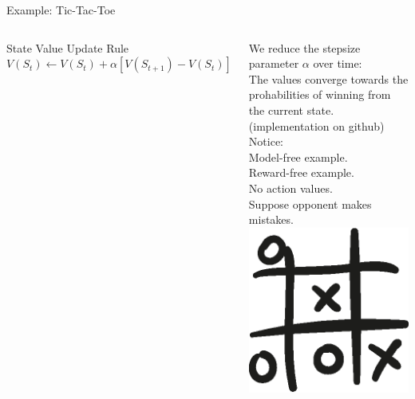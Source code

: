 \documentclass{beamer}
\begin{document}
\begin{frame}{Example: Tic-Tac-Toe}
	\begin{columns}
	\begin{alertblock}{State Value Update Rule}
		$V(S_t) \leftarrow V(S_t) + \alpha[V(S_{t+1}) - V(S_{t})]$\\
	\end{alertblock}
	\vspace{0.1cm}
	We reduce the stepsize parameter $\alpha$ over time:\\
	The values converge towards the prohabilities of winning from the current state. \\
	(implementation on github)\\
	\vspace{0.5cm}
	Notice:\\
	\hspace{1cm} Model-free example. \\
	\hspace{1cm} Reward-free example. \\
	\hspace{1cm} No action values.\\
	\hspace{1cm} Suppose opponent makes mistakes.
		\includegraphics[width=\linewidth]{Images/tic-tac-toe-hand-drawn-game.eps}\\
	\end{columns}

\end{frame}
\end{document}
